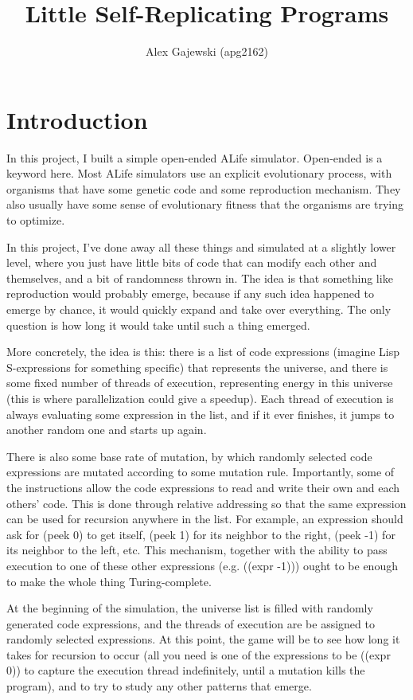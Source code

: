 \documentclass[letterpaper,11pt]{article}
\title{Little Self-Replicating Programs}
\author{Alex Gajewski (apg2162)}
\begin{document}
\begin{titlepage}
\maketitle
\end{titlepage}

\section{Introduction}
In this project, I built a simple open-ended ALife simulator. Open-ended is a keyword here. Most ALife simulators use an explicit evolutionary process, with organisms that have some genetic code and some reproduction mechanism. They also usually have some sense of evolutionary fitness that the organisms are trying to optimize.

In this project, I've done away all these things and simulated at a slightly lower level, where you just have little bits of code that can modify each other and themselves, and a bit of randomness thrown in. The idea is that something like reproduction would probably emerge, because if any such idea happened to emerge by chance, it would quickly expand and take over everything. The only question is how long it would take until such a thing emerged.

More concretely, the idea is this: there is a list of code expressions (imagine Lisp S-expressions for something specific) that represents the universe, and there is some fixed number of threads of execution, representing energy in this universe (this is where parallelization could give a speedup). Each thread of execution is always evaluating some expression in the list, and if it ever finishes, it jumps to another random one and starts up again.

There is also some base rate of mutation, by which randomly selected code expressions are mutated according to some mutation rule. Importantly, some of the instructions allow the code expressions to read and write their own and each others' code. This is done through relative addressing so that the same expression can be used for recursion anywhere in the list. For example, an expression should ask for (peek 0) to get itself, (peek 1) for its neighbor to the right, (peek -1) for its neighbor to the left, etc. This mechanism, together with the ability to pass execution to one of these other expressions (e.g. ((expr -1))) ought to be enough to make the whole thing Turing-complete.

At the beginning of the simulation, the universe list is filled with randomly generated code expressions, and the threads of execution are be assigned to randomly selected expressions. At this point, the game will be to see how long it takes for recursion to occur (all you need is one of the expressions to be ((expr 0)) to capture the execution thread indefinitely, until a mutation kills the program), and to try to study any other patterns that emerge.
\end{document}
